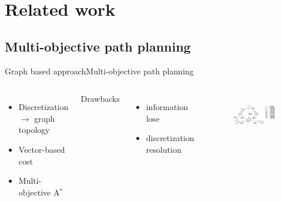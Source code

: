 \section{Related work}

\subsection{Multi-objective path planning}

\begin{frame}{Graph based approach}{Multi-objective path planning}
\begin{columns}
\begin{itemize}
\item Discretization $ \rightarrow $ graph topology
\item Vector-based cost
\item Multi-objective A$ ^{*}$
\end{itemize}
Drawbacks
\begin{itemize}
\item information lose
\item discretization resolution
\end{itemize}
	\begin{figure}
		\centering
		\includegraphics[width=.9\linewidth]{figure/graph_based_solution.png}
		\label{fig:graph_based_solution}
	\end{figure}
\end{columns}
\end{frame}

